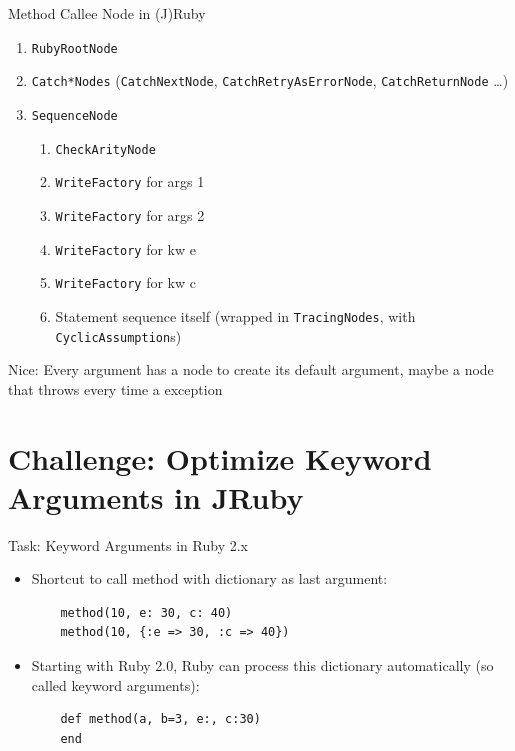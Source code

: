 \documentclass[xcolor=dvipsname,handout]{beamer} %
\begin{document}
\begin{frame}{Method Callee Node in (J)Ruby}
\begin{enumerate}
 \item \lstinline{RubyRootNode}
 \item \lstinline{Catch*Nodes} (\lstinline{CatchNextNode}, \lstinline{CatchRetryAsErrorNode}, \lstinline{CatchReturnNode} \dots)
 \item \lstinline{SequenceNode} \begin{enumerate}
    \item \lstinline{CheckArityNode}
    \item \lstinline{WriteFactory} for args 1
    \item \lstinline{WriteFactory} for args 2
    \item \lstinline{WriteFactory} for kw e
    \item \lstinline{WriteFactory} for kw c
    \item Statement sequence itself (wrapped in \lstinline{TracingNodes}, with \lstinline{CyclicAssumption}s)
  \end{enumerate}
\end{enumerate}
Nice: Every argument has a node to create its default argument, maybe a node that throws every time a exception
\end{frame}



\section{Challenge: Optimize Keyword Arguments in JRuby}

\begin{frame}[fragile]{Task: Keyword Arguments in Ruby 2.x}

\begin{itemize}
 \item Shortcut to call method with dictionary as last argument:
    \begin{lstlisting}
    method(10, e: 30, c: 40)
    method(10, {:e => 30, :c => 40})
    \end{lstlisting}
  \item Starting with Ruby 2.0, Ruby can process this dictionary automatically (so called keyword arguments):
    \begin{lstlisting}
    def method(a, b=3, e:, c:30)
    end
    \end{lstlisting}
\end{itemize}
\end{frame}
\end{document}
